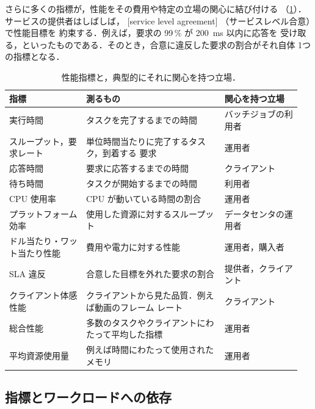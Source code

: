 \documentclass[../main.tex]{subfiles}
\begin{document}
さらに多くの指標が，性能をその費用や特定の立場の関心に結び付ける
（\cref{tab:l06-metrics}）．サービスの提供者はしばしば，
[service level agreement]%
（サービスレベル合意）で性能目標を
約束する．例えば，要求の 99\,\% が \SI{200}{\milli\second} 以内に応答を
受け取る，といったものである．そのとき，合意に違反した要求の割合がそれ自体
1つの指標となる．

\begin{table}[htbp]
  \centering
  \caption{性能指標と，典型的にそれに関心を持つ立場．}
  \label{tab:l06-metrics}
  \small
  \setlength{\tabcolsep}{4pt}
  \begin{tabular}{@{}>{\raggedright\arraybackslash}p{0.25\linewidth}>{\raggedright\arraybackslash}p{0.45\linewidth}>{\raggedright\arraybackslash}p{0.25\linewidth}@{}}
    \toprule
    指標 & 測るもの & 関心を持つ立場 \\
    \midrule
    実行時間 & タスクを完了するまでの時間 & バッチジョブの利用者 \\
    スループット，要求レート & 単位時間当たりに完了するタスク，到着する
      要求 & 運用者 \\
    応答時間 & 要求に応答するまでの時間 & クライアント \\
    待ち時間 & タスクが開始するまでの時間 & 利用者 \\
    CPU 使用率 & CPU が動いている時間の割合 & 運用者 \\
    プラットフォーム効率 & 使用した資源に対するスループット &
      データセンタの運用者 \\
    ドル当たり・ワット当たり性能 & 費用や電力に対する性能 & 運用者，購入者 \\
    SLA 違反 & 合意した目標を外れた要求の割合 & 提供者，クライアント \\
    クライアント体感性能 & クライアントから見た品質．例えば動画のフレーム
      レート & クライアント \\
    総合性能 & 多数のタスクやクライアントにわたって平均した指標 & 運用者 \\
    平均資源使用量 & 例えば時間にわたって使用されたメモリ & 運用者 \\
    \bottomrule
  \end{tabular}
\end{table}

\subsection{指標とワークロードへの依存}
\end{document}
